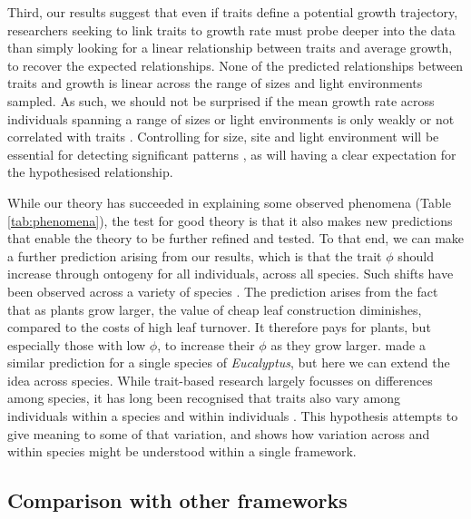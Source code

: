 \documentclass[a4paper,11pt]{article}
\begin{document}
Third, our results suggest that even if traits define a potential growth trajectory, researchers seeking to link traits to growth rate must probe deeper into the data than simply looking for a linear relationship between traits and average growth, to recover the expected relationships. None of the predicted relationships between traits and growth is linear across the range of sizes and light environments sampled. As such, we should not be surprised if the mean growth rate across individuals spanning a range of sizes or light environments is only weakly or not correlated with traits \citep[e.g.][]{Poorter-2008,Paine-2015}. Controlling for size, site and light environment will be essential for detecting significant patterns \citep[e.g.][]{Gibert-2016}, as will having a clear expectation for the hypothesised relationship.

While our theory has succeeded in explaining some observed phenomena (Table \ref{tab:phenomena}), the test for good theory is that it also makes new predictions that enable the theory to be further refined and tested. To that end, we can make a further prediction arising from our results, which is that the trait $\phi$ should increase through ontogeny for all individuals, across all species. Such shifts have been observed across a variety of species \citet{King-1999,Thomas-1999,Koch-2004}. The prediction arises from the fact that as plants grow larger, the value of cheap leaf construction diminishes, compared to the costs of high leaf turnover. It therefore pays for plants, but especially those with low $\phi$, to increase their $\phi$ as they grow larger. \citet{King-1999} made a similar prediction for a single species of \emph{Eucalyptus}, but here we can extend the idea across species. While trait-based research largely focusses on differences among species, it has long been recognised that traits also vary among individuals within a species and within individuals \citep{Westoby-2002}. This hypothesis attempts to give meaning to some of that variation, and shows how variation across and within species might be understood within a single framework.

\subsection{Comparison with other frameworks}
\end{document}
